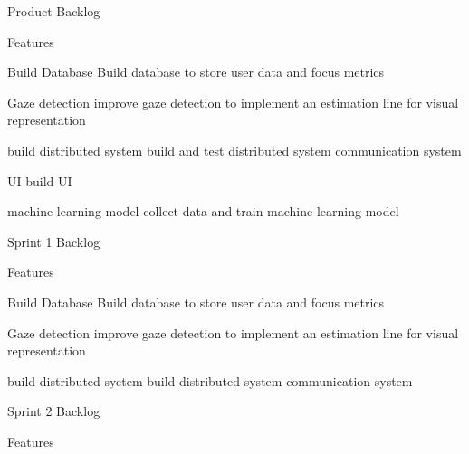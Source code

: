 \documentclass[12pt]{article}
\begin{document}
\begin{sectionbox}[colback=white]{Product Backlog}
\begin{subsectionbox}[colback=white]{Features}
\begin{featurebox}[colback=white]{Build Database}
Build database to store user data and focus metrics
\end{featurebox}
\begin{featurebox}[colback=white]{Gaze detection}
improve gaze detection to implement an estimation line for visual representation
\end{featurebox}
\begin{featurebox}[colback=white]{build distributed system}
build and test distributed system communication system
\end{featurebox}
\begin{featurebox}[colback=white]{UI}
build UI
\end{featurebox}
\begin{featurebox}[colback=white]{machine learning model}
collect data and train machine learning model
\end{featurebox}
\end{subsectionbox}
\end{sectionbox}

\begin{sectionbox}[colback=white]{Sprint 1 Backlog}
\begin{subsectionbox}[colback=white]{Features}
\begin{featurebox}[colback=white]{Build Database}
Build database to store user data and focus metrics
\end{featurebox}
\begin{featurebox}[colback=white]{Gaze detection}
improve gaze detection to implement an estimation line for visual representation
\end{featurebox}
\begin{featurebox}[colback=white]{build distributed syetem}
build distributed system communication system
\end{featurebox}
\end{subsectionbox}
\end{sectionbox}

\begin{sectionbox}[colback=white]{Sprint 2 Backlog}
\begin{subsectionbox}[colback=white]{Features}
\begin{featurebox}[colback=white]{}

\end{featurebox}
\begin{featurebox}[colback=white]{}

\end{featurebox}
\begin{featurebox}[colback=white]{}

\end{featurebox}
\end{subsectionbox}
\end{sectionbox}
\end{document}
